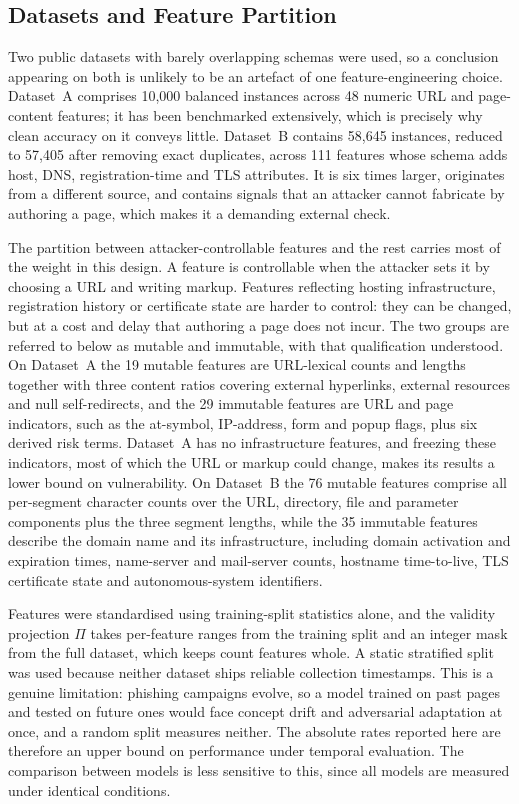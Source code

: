\documentclass[runningheads]{llncs}
\begin{document}
\subsection{Datasets and Feature Partition}
\label{sec:data}

Two public datasets with barely overlapping schemas were used, so a conclusion
appearing on both is unlikely to be an artefact of one feature-engineering
choice. Dataset~A \cite{tan2018} comprises 10,000 balanced
instances across 48 numeric URL and page-content features; it has been
benchmarked extensively, which is precisely why clean accuracy on it conveys
little. Dataset~B \cite{vrbancic2020} contains 58,645 instances, reduced to
57,405 after removing exact duplicates, across 111 features whose schema adds
host, DNS, registration-time and TLS attributes. It is six times larger, originates
from a different source, and contains signals that an attacker cannot fabricate
by authoring a page, which makes it a demanding external check.

The partition between attacker-controllable features and the rest carries most
of the weight in this design. A feature is controllable when the attacker sets
it by choosing a URL and writing markup. Features reflecting hosting
infrastructure, registration history or certificate state are harder to control:
they can be changed, but at a cost and delay that authoring a page does not
incur. The two groups are referred to below as mutable and immutable, with that
qualification understood. On Dataset~A the 19 mutable
features are URL-lexical counts and lengths together with three content ratios
covering external hyperlinks, external resources and null self-redirects, and the
29 immutable features are URL and page indicators, such as the at-symbol,
IP-address, form and popup flags, plus six derived risk terms. Dataset~A has no
infrastructure features, and freezing these indicators, most of which the URL or
markup could change, makes its results a lower bound on vulnerability. On Dataset~B the 76 mutable features comprise all per-segment character
counts over the URL, directory, file and parameter components plus the three
segment lengths, while the 35 immutable features describe the domain name
and its infrastructure, including domain activation and expiration times, name-server and mail-server counts, hostname time-to-live, TLS
certificate state and autonomous-system identifiers.

Features were standardised using training-split statistics alone, and the
validity projection $\Pi$ takes per-feature ranges from the training split and an
integer mask from the full dataset, which keeps count features whole. A static stratified
split was used because neither dataset ships reliable collection timestamps. This
is a genuine limitation: phishing campaigns evolve, so a model trained on past
pages and tested on future ones would face concept drift and adversarial
adaptation at once, and a random split measures neither. The absolute rates
reported here are therefore an upper bound on performance under temporal
evaluation. The comparison between models is less sensitive to this, since all
models are measured under identical conditions.
\end{document}
